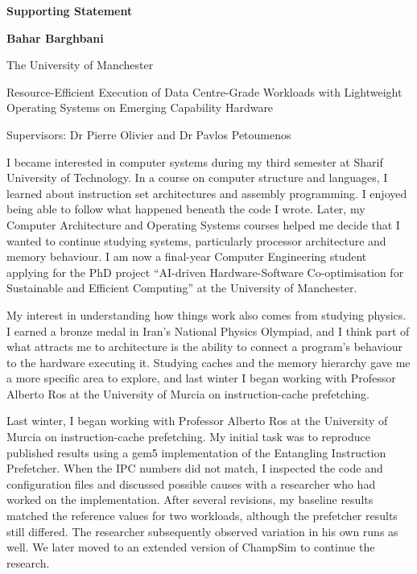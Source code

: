 \documentclass[11pt,a4paper]{article}
\newcommand{\ApplicantName}{Bahar Barghbani}
\newcommand{\UniversityName}{The University of Manchester}
\newcommand{\ProjectTitle}{Resource-Efficient Execution of Data Centre-Grade
Workloads with Lightweight Operating Systems on Emerging Capability Hardware}
\newcommand{\Supervisors}{Dr Pierre Olivier and Dr Pavlos Petoumenos}
\begin{document}
\begin{center}
    {\Large\bfseries Supporting Statement}\par
    \vspace{0.35em}
    {\normalsize\bfseries\ApplicantName}\par
    \vspace{0.25em}
    {\small\UniversityName}\par
    \vspace{0.5em}
    \begin{minipage}{0.95\textwidth}
        \centering\small\ProjectTitle
    \end{minipage}\par
    \vspace{0.35em}
    {\small Supervisors: \Supervisors}
\end{center}
\vspace{0.3em}

I became interested in computer systems during my third semester at Sharif University of Technology. In a course on computer structure and languages, I learned about instruction set architectures and assembly programming. I enjoyed being able to follow what happened beneath the code I wrote. Later, my Computer Architecture and Operating Systems courses helped me decide that I wanted to continue studying systems, particularly processor architecture and memory behaviour. I am now a final-year Computer Engineering student applying for the PhD project “AI-driven Hardware-Software Co-optimisation for Sustainable and Efficient Computing” at the University of Manchester.

My interest in understanding how things work also comes from studying physics. I earned a bronze medal in Iran’s National Physics Olympiad, and I think part of what attracts me to architecture is the ability to connect a program’s behaviour to the hardware executing it. Studying caches and the memory hierarchy gave me a more specific area to explore, and last winter I began working with Professor Alberto Ros at the University of Murcia on instruction-cache prefetching.

Last winter, I began working with Professor Alberto Ros at the University of Murcia on instruction-cache prefetching. My initial task was to reproduce published results using a gem5 implementation of the Entangling Instruction Prefetcher. When the IPC numbers did not match, I inspected the code and configuration files and discussed possible causes with a researcher who had worked on the implementation. After several revisions, my baseline results matched the reference values for two workloads, although the prefetcher results still differed. The researcher subsequently observed variation in his own runs as well. We later moved to an extended version of ChampSim to continue the research.
\end{document}
